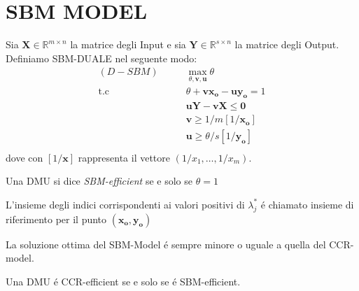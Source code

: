 \section{SBM MODEL}
\bigskip
\begin{definiz}
Sia $\boldsymbol{X} \in \mathbb{R}^{m \times n}$ la matrice degli Input e sia $\boldsymbol{Y} \in \mathbb{R}^{s \times n}$  la matrice degli Output. Definiamo SBM-DUALE nel seguente modo:
\begin{equation}
\begin{split}
(D-SBM) \qquad & \max_{\theta, \boldsymbol{v, u}} \theta \\
\text{t.c} \qquad & \theta + \boldsymbol{vx_o - uy_o} =  1 \\
& \boldsymbol{uY - vX} \leq \boldsymbol{0} \\
& \boldsymbol{v} \geq 1/m[1/\boldsymbol{x_o}] \\
& \boldsymbol{u} \geq \theta/s[1/\boldsymbol{y_o}] \\
\end{split}
\end{equation}
dove con $[1/\boldsymbol{x}]$ rappresenta il vettore $(1/x_1, \dots , 1/x_m)$.
\end{definiz}
\begin{definiz}
Una DMU si dice \emph{SBM-efficient} se e solo se $\theta = 1$
\end{definiz}
\begin{definiz} L'insieme degli indici corrispondenti ai valori positivi di $\lambda^*_{j}$ \'e chiamato insieme di riferimento per il punto $(\boldsymbol{x_{o}, y_{o}})$
\end{definiz}
\begin{teor} La soluzione ottima del SBM-Model \'e sempre minore o uguale a quella del CCR-model.
\end{teor}
\begin{teor} Una DMU \'e CCR-efficient se e solo se \'e SBM-efficient.
\end{teor}
